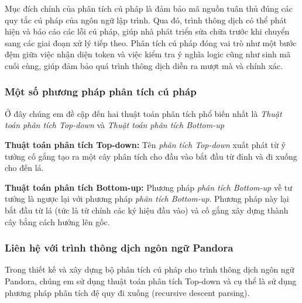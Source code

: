     
    

Mục đích chính của phân tích cú pháp là đảm bảo mã nguồn tuân thủ đúng các quy tắc cú pháp của ngôn ngữ lập trình. Qua đó, trình thông dịch có thể phát hiện và báo cáo các lỗi cú pháp, giúp nhà phát triển sửa chữa trước khi chuyển sang các giai đoạn xử lý tiếp theo. Phân tích cú pháp đóng vai trò như một bước đệm giữa việc nhận diện token và việc kiểm tra ý nghĩa logic cũng như sinh mã cuối cùng, giúp đảm bảo quá trình thông dịch diễn ra mượt mà và chính xác.
\subsubsection{Một số phương pháp phân tích cú pháp}
Ở đây chúng em đề cập đến hai thuật toán phân tích phổ biến nhất là \textit{Thuật toán phân tích Top-down} và \textit{Thuật toán phân tích Bottom-up}

\textbf{Thuật toán phân tích Top-down:}
Tên \textit{phân tích Top-down} xuất phát từ ý tưởng cố gắng tạo ra một cây phân tích cho đầu vào bắt đầu từ đỉnh và đi xuống cho đến lá.

\textbf{Thuật toán phân tích Bottom-up:}
Phương pháp \textit{phân tích Bottom-up} về tư tưởng là ngược lại với phương pháp \textit{phân tích Bottom-up}. Phương pháp này lại bắt đầu từ lá (tức là từ chính các ký hiệu đầu vào) và cố gắng xây dựng thành cây bằng cách hướng lên gốc.

\subsubsection{Liên hệ với trình thông dịch ngôn ngữ Pandora}
Trong thiết kế và xây dựng bộ phân tích cú pháp cho trình thông dịch ngôn ngữ Pandora, chúng em sử dụng thuật toán phân tích Top-down và cụ thể là sử dụng phương pháp phân tích đệ quy đi xuống (recursive descent parsing).

